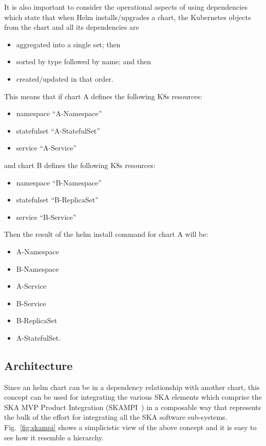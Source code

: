 \documentclass[a4paper,
               keeplastbox,   %
               ]{jacow}
\begin{document}
It is also important to consider the operational aspects of using dependencies which state that when Helm installs/upgrades a chart, the Kubernetes objects from the chart and all its dependencies are
\begin{itemize}
    \item aggregated into a single set; then
    \item sorted by type followed by name; and then
    \item created/updated in that order.
\end{itemize}
This means that if chart A defines the following K8s resources:
\begin{itemize}
    \item namespace “A-Namespace”
    \item statefulset “A-StatefulSet”
    \item service “A-Service”
\end{itemize}
and chart B defines the following K8s resources:
\begin{itemize}
    \item namespace “B-Namespace”
    \item statefulset “B-ReplicaSet”
    \item service “B-Service”
\end{itemize}
Then the result of the helm install command for chart A will be:
\begin{itemize}
    \item A-Namespace
    \item B-Namespace
    \item A-Service
    \item B-Service
    \item B-ReplicaSet
    \item A-StatefulSet.
\end{itemize}

\subsection{Architecture}
Since an helm chart can be in a dependency relationship with another chart, this concept can be used for integrating the various SKA elements which comprise the SKA MVP Product Integration (SKAMPI~\cite{SKAMPI}) in a composable way that represents the bulk of the effort for integrating all the SKA software sub-systems. Fig.~\ref{fig:skampi} shows a simplicistic view of the above concept and it is easy to see how it resemble a hierarchy.
\end{document}
